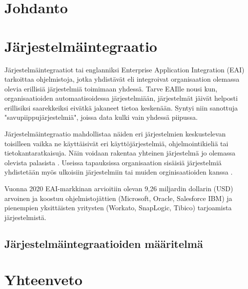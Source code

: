 
\chapter{Johdanto}

\chapter{Järjestelmäintegraatio}


Järjestelmäintegraatiot tai englanniksi Enterprise Application Integration (EAI) tarkoittaa ohjelmistoja, jotka yhdistävät eli integroivat organisaation olemassa olevia erillisiä järjestelmiä toimimaan yhdessä. Tarve EAIlle nousi kun, organisaatioiden automaatisoidessa järjestelmiään, järjestelmät jäivät helposti erillisiksi saarekkeiksi eivätkä jakaneet tietoa keskenään. Syntyi niin sanottuja "savupiippujärjestelmiä", joissa data kulki vain yhdessä piipussa. 

Järjestelmäintegraatio mahdollistaa näiden eri järjestelmien keskustelevan toisilleen vaikka ne käyttäisivät eri käyttöjärjestelmiä, ohjelmointikieliä tai tietokantaratkaisuja. Näin voidaan rakentaa yhteinen järjestelmä jo olemassa olevista palasista \cite{linthicum2000enterprise}. Useissa tapauksissa organisaation sisäisiä järjestelmiä yhdistetään myös ulkoisiin järjestelmiin tai muiden orginisaatioiden kanssa \cite{Johannesson2001}.


Vuonna 2020 EAI-markkinan arvioitiin olevan 9,26 miljardin dollarin (USD) arvoinen \citep{mordorintelligence} ja koostuu ohjelmistojättien (Microsoft, Oracle, Salesforce IBM) ja pienempien yksittäisten yritysten (Workato, SnapLogic, Tibico) tarjoamista järjestelmistä.

\section{Järjestelmäintegraatioiden määritelmä}



\chapter{Yhteenveto}